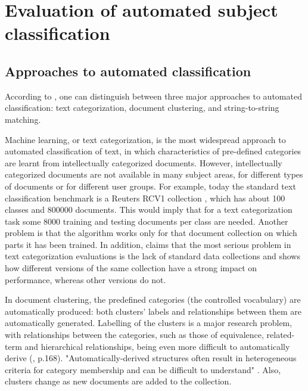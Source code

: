 \section{Evaluation of automated subject classification}
\label{autoclasseval}

\subsection{Approaches to automated classification}
According to \cite{Golub_Review}, one can distinguish between three major approaches to automated classification: text categorization, document clustering, and string-to-string matching. 

Machine learning, or text categorization, is the most widespread approach to automated classification of text, in which characteristics of pre-defined categories are learnt from intellectually categorized documents. However, intellectually categorized documents are not available in many subject areas, for different types of documents or for different user groups. For example, today the standard text classification benchmark is a Reuters RCV1 collection \cite{Lewis_etal_04}, which has about 100 classes and 800000 documents. This would imply that for a text categorization task some 8000 training and testing documents per class are needed. Another problem is that the algorithm works only for that document collection on which parts it has been trained. In addition, \cite{Yang_99} claims that the most serious problem in text categorization evaluations is the lack of standard data collections and shows how different versions of the same collection have a strong impact on performance, whereas other versions do not. 

In document clustering, the predefined categories (the controlled vocabulary) are automatically produced: both clusters' labels and relationships between them are automatically generated. Labelling of the clusters is a major research problem, with relationships between the categories, such as those of equivalence, related-term and hierarchical relationships, being even more difficult to automatically derive (\cite{Svenonius_2000}, p.168). "Automatically-derived structures often result in heterogeneous criteria for category membership and can be difficult to understand" \cite{Chen_Dumais_2000}. Also, clusters change as new documents are added to the collection. 

